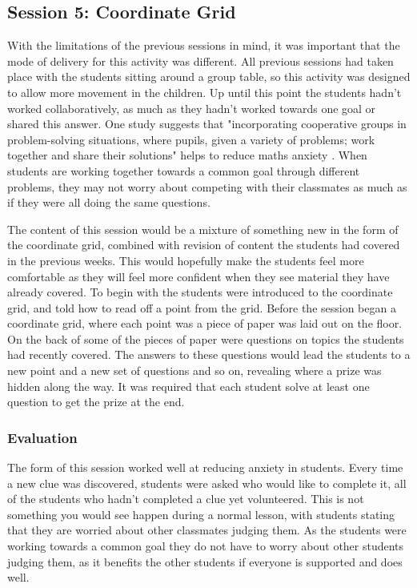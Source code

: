 \documentclass[11pt, a4paper, notitlepage]{article}
\begin{document}
\subsection{Session 5: Coordinate Grid}
With the limitations of the previous sessions in mind, it was important that the mode of delivery for this activity was different. All previous sessions had taken place with the students sitting around a group table, so this activity was designed to allow more movement in the children. Up until this point the students hadn't worked collaboratively, as much as they hadn't worked towards one goal or shared this answer. One study suggests that "incorporating cooperative groups in problem-solving situations, where pupils, given a  variety of problems; work together and share their solutions" helps to reduce maths anxiety \cite{Alkan:2013}. When students are working together towards a common goal through different problems, they may not worry about competing with their classmates as much as if they were all doing the same questions.
\par
The content of this session would be a mixture of something new in the form of the coordinate grid, combined with revision of content the students had covered in the previous weeks. This would hopefully make the students feel more comfortable as they will feel more confident when they see material they have already covered. To begin with the students were introduced to the coordinate grid, and told how to read off a point from the grid. Before the session began a coordinate grid, where each point was a piece of paper was laid out on the floor. On the back of some of the pieces of paper were questions on topics the students had recently covered. The answers to these questions would lead the students to a new point and a new set of questions and so on, revealing where a prize was hidden along the way. It was required that each student solve at least one question to get the prize at the end. 
\subsubsection*{Evaluation} 
The form of this session worked well at reducing anxiety in students. Every time a new clue was discovered, students were asked who would like to complete it, all of the students who hadn't completed a clue yet volunteered. This is not something you would see happen during a normal lesson, with students stating that they are worried about other classmates judging them. As the students were working towards a common goal they do not have to worry about other students judging them, as it benefits the other students if everyone is supported and does well.
\end{document}
